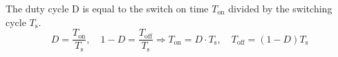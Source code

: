 \begin{solutionblock}
\begin{center}
     \end{center}
         The duty cycle D is equal to the switch on time $T_{\mathrm{on}}$ divided by the switching cycle $T_{\mathrm{s}}$.
     $$D= \frac{T_\text{on}}{T_\text{s}}, \quad 1-D = \frac{T_\text{off}}{T_\text{s}} \Rightarrow T_\text{on} = D \cdot T_\text{s}, \quad T_\text{off} = (1-D) T_\text{s}$$
\end {solutionblock}




